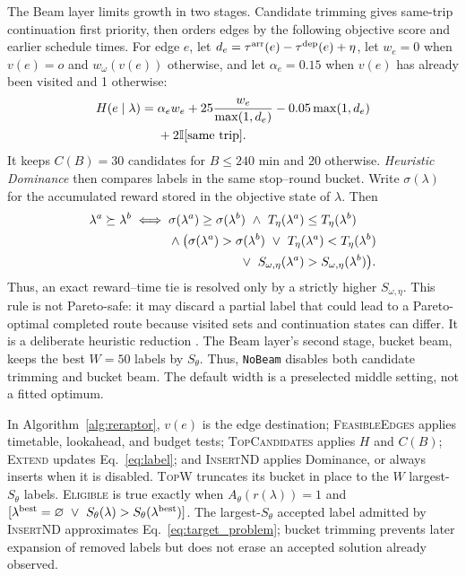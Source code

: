 The Beam layer limits growth in two stages. Candidate trimming gives same-trip
continuation first priority, then orders edges by the following objective score
and earlier schedule times. For edge \(e\), let
\(d_e=\tau^{\rm arr}(e)-\tau^{\rm dep}(e)+\eta\), let \(w_e=0\) when
\(v(e)=o\) and \(w_\omega(v(e))\) otherwise, and let \(\alpha_e=0.15\) when
\(v(e)\) has already been visited and 1 otherwise:
\begin{equation}
    \label{eq:edge_priority}
    \begin{aligned}
    H(e\mid\lambda)={}&\alpha_e w_e+
    25\frac{w_e}{\max(1,d_e)}-0.05\max(1,d_e)\\
    &+2\mathbb{I}[\text{same trip}].
    \end{aligned}
\end{equation}
It keeps \(C(B)=30\) candidates for \(B\leq240\) min and 20 otherwise.
\emph{Heuristic Dominance} then compares labels in the same
stop--round bucket. Write \(\sigma(\lambda)\) for the accumulated reward stored
in the objective state of \(\lambda\). Then
\begin{equation}
    \label{eq:dominance_stop_reward}
    \begin{aligned}
    \lambda^a\succeq\lambda^b \iff{}&
    \sigma(\lambda^a)\geq\sigma(\lambda^b)
    \ \land\ T_\eta(\lambda^a)\leq T_\eta(\lambda^b)\\
    &\land\bigl(\sigma(\lambda^a)>\sigma(\lambda^b)
    \ \lor\ T_\eta(\lambda^a)<T_\eta(\lambda^b)\\
    &\hspace{20mm}\lor\ S_{\omega,\eta}(\lambda^a)>
    S_{\omega,\eta}(\lambda^b)\bigr).
    \end{aligned}
\end{equation}
Thus, an exact reward--time tie is resolved only by a strictly higher
\(S_{\omega,\eta}\). This rule is not Pareto-safe: it may discard a partial
label that could lead to a Pareto-optimal completed route because visited sets
and continuation states can differ. It is a deliberate heuristic reduction
\cite{demeyer2013martins,he2022paretojourneys}. The Beam layer's second stage,
bucket beam, keeps the best \(W=50\) labels by \(S_\theta\). Thus,
\texttt{NoBeam} disables both candidate trimming and bucket beam. The default
width is a preselected middle setting, not a fitted optimum.

In Algorithm~\ref{alg:reraptor}, \(v(e)\) is the edge destination;
\textsc{FeasibleEdges} applies timetable, lookahead, and budget tests;
\textsc{TopCandidates} applies \(H\) and \(C(B)\); \textsc{Extend} updates
Eq.~\ref{eq:label}; and \textsc{InsertND} applies Dominance, or always inserts
when it is disabled. \textsc{TopW} truncates its bucket in place to the \(W\)
largest-\(S_\theta\) labels. \textsc{Eligible} is true exactly when
\(A_\theta(r(\lambda))=1\) and
\([\lambda^{\rm best}=\varnothing\ \lor\
S_\theta(\lambda)>S_\theta(\lambda^{\rm best})]\).
The largest-\(S_\theta\) accepted label admitted by \textsc{InsertND} approximates
Eq.~\ref{eq:target_problem}; bucket trimming prevents later expansion of removed
labels but does not erase an accepted solution already observed.

